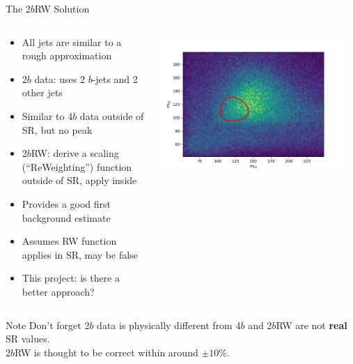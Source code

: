 \documentclass[10pt, aspectratio=169]{beamer}
\begin{document}
\begin{frame}{The 2$b$RW Solution}
  \begin{columns}[onlytextwidth]
    \begin{column}{0.6\textwidth}
      \begin{itemize}
        \item All jets are similar to a rough approximation
        \item \alert{2$b$ data}: uses 2 $b$-jets and 2 other jets
        \item Similar to 4$b$ data outside of SR, but no peak
        \item 2$b$RW: derive a scaling (``ReWeighting'') function outside of SR, apply inside
        \item Provides a good first background estimate
        \item Assumes RW function applies in SR, may be false
        \item \alert{This project}: is there a better approach?
      \end{itemize}
    \end{column}
    \begin{column}{0.4\textwidth}
      \includegraphics[width=\linewidth]{images/fullmassplane_2tag_data.png}\\
    \end{column}
​  \end{columns}
  \begin{alertblock}{Note}
    Don't forget 2$b$ data is physically different from 4$b$ and 2$b$RW are not \textbf{real} SR values.\\
    2$b$RW is thought to be correct within around $\pm 10\%$.
	\end{alertblock}
\end{frame}
\end{document}
